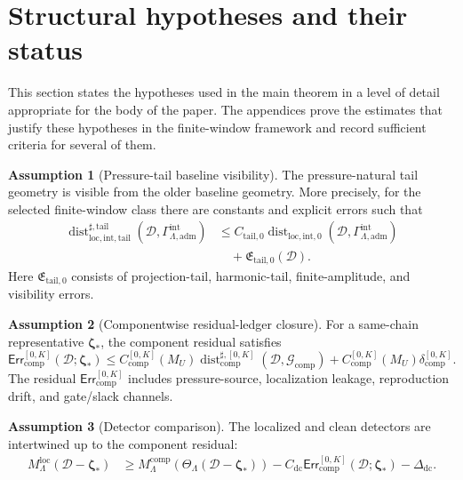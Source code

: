 \documentclass[11pt]{article}
\numberwithin{equation}{section}
\theoremstyle{definition}
\newtheorem{assumption}[assumption]{Assumption}
\theoremstyle{remark}
\newcommand{\loc}{\mathrm{loc}}
\newcommand{\intg}{\mathrm{int}}
\newcommand{\tail}{\mathrm{tail}}
\newcommand{\adm}{\mathrm{adm}}
\newcommand{\comp}{\mathrm{comp}}
\newcommand{\Err}{\mathsf{Err}}
\newcommand{\Dist}{\operatorname{dist}}
\newcommand{\calD}{\mathcal D}
\newcommand{\calG}{\mathcal G}
\newcommand{\bzeta}{\boldsymbol\zeta}
\begin{document}
\section{Structural hypotheses and their status}\label{sec:hypotheses}

This section states the hypotheses used in the main theorem in a level of detail appropriate for the body of the paper.  The appendices prove the estimates that justify these hypotheses in the finite-window framework and record sufficient criteria for several of them.

\begin{assumption}[Pressure-tail baseline visibility]\label{ass:main-pressure-tail-visibility}
The pressure-natural tail geometry is visible from the older baseline geometry.  More precisely, for the selected finite-window class there are constants and explicit errors such that
\begin{equation}\label{eq:ass-pressure-tail-visibility}
\begin{aligned}
\Dist^{\sharp,\tail}_{\loc,\intg,\tail}
(\calD,\Gamma^{\intg}_{\Lambda,\adm})
&\le
C_{\tail,0}
\Dist_{\loc,\intg,0}
(\calD,\Gamma^{\intg}_{\Lambda,\adm})\\
&\quad
+
\mathfrak E_{\tail,0}(\calD).
\end{aligned}
\end{equation}
Here \(\mathfrak E_{\tail,0}\) consists of projection-tail, harmonic-tail, finite-amplitude, and visibility errors.
\end{assumption}

\begin{assumption}[Componentwise residual-ledger closure]\label{ass:main-ledger-closure}
For a same-chain representative \(\bzeta_*\), the component residual satisfies
\begin{equation}\label{eq:ass-ledger-closure}
        \Err_{\comp}^{[0,K]}(\calD;\bzeta_*)
        \le
        C_{\comp}^{[0,K]}(M_U)
        \Dist_{\comp}^{\sharp,[0,K]}(\calD,\calG_{\comp})
        +
        C_{\comp}^{[0,K]}(M_U)
        \delta_{\comp}^{[0,K]}.
\end{equation}
The residual \(\Err_{\comp}^{[0,K]}\) includes pressure-source, localization leakage, reproduction drift, and gate/slack channels.
\end{assumption}

\begin{assumption}[Detector comparison]\label{ass:main-detector-comparison}
The localized and clean detectors are intertwined up to the component residual:
\begin{equation}\label{eq:ass-detector-comparison}
\begin{aligned}
        M_\Lambda^{\loc}(\calD-\bzeta_*)
        &\ge
        M_\Lambda^{\comp}(\Theta_\Lambda(\calD-\bzeta_*))
        -C_{\mathrm{dc}}
        \Err_{\comp}^{[0,K]}(\calD;\bzeta_*)
        -\Delta_{\mathrm{dc}}.
\end{aligned}
\end{equation}
\end{assumption}
\end{document}
